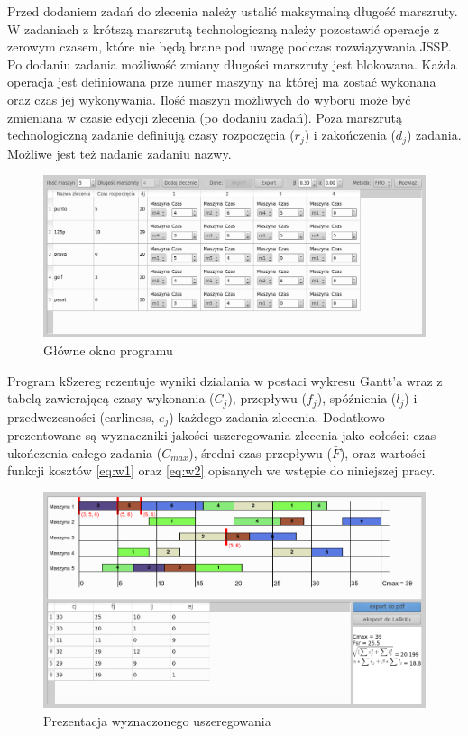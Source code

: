 \documentclass[twoside]{kInzynierka}
\begin{document}
Przed dodaniem zadań do zlecenia należy ustalić maksymalną długość marszruty. W zadaniach z krótszą marszrutą technologiczną należy pozostawić operacje z zerowym czasem, które nie będą brane pod uwagę podczas rozwiązywania JSSP. Po dodaniu zadania możliwość zmiany długości marszruty jest blokowana. Każda operacja jest definiowana prze numer maszyny na której ma zostać wykonana oraz czas jej wykonywania. Ilość maszyn możliwych do wyboru może być zmieniana w czasie edycji zlecenia (po dodaniu zadań). Poza marszrutą technologiczną zadanie definiują czasy rozpoczęcia (\(r_j\)) i zakończenia (\(d_j\)) zadania. Możliwe jest też nadanie zadaniu nazwy.

\begin{figure}[htb]
    \centering
    \includegraphics[width=\textwidth, keepaspectratio=true]{./obrazki/main}
    \caption{Główne okno programu}
\end{figure}

Program kSzereg rezentuje wyniki działania w postaci wykresu Gantt'a wraz z tabelą zawierającą czasy wykonania (\(C_j\)), przepływu (\(f_j\)), spóźnienia (\(l_j\)) i przedwczesności (earliness, \(e_j\)) każdego zadania zlecenia. Dodatkowo prezentowane są wyznaczniki jakości uszeregowania zlecenia jako cołości: czas ukończenia całego zadania (\(C_{max}\)), średni czas przepływu (\( \bar{F} \)), oraz wartości funkcji kosztów \eqref{eq:w1} oraz \eqref{eq:w2} opisanych we wstępie do niniejszej pracy. 

\begin{figure}[htb]
    \centering
    \includegraphics[width=\textwidth, keepaspectratio=true]{./obrazki/wykres}
    \caption{Prezentacja wyznaczonego uszeregowania}
\end{figure}
\end{document}

